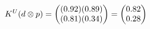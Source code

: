 \documentclass[preview]{standalone}
\begin{document}
\begin{align*}
\special{dvisvgm:raw <g id='unique000'>}K^U(d \otimes p) = \begin{pmatrix} (0.92)(0.89) \\ (0.81)(0.34) \end{pmatrix} = \begin{pmatrix} 0.82 \\ 0.28 \end{pmatrix}\special{dvisvgm:raw </g>}
\end{align*}
\end{document}
